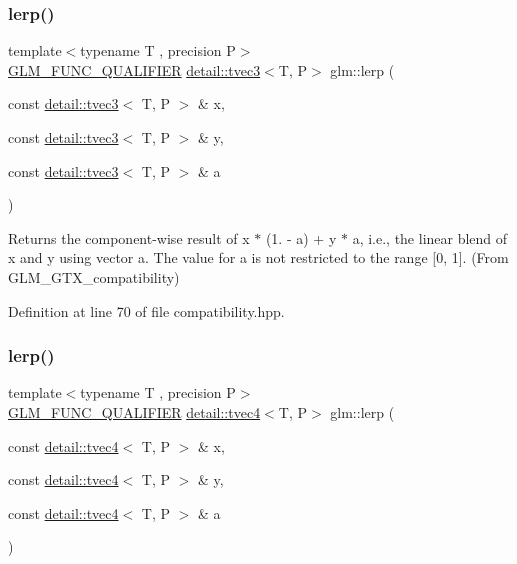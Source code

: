 \subsubsection{\texorpdfstring{lerp()}{lerp()}\hspace{0.1cm}{\footnotesize\ttfamily [6/7]}}
{\footnotesize\ttfamily template$<$typename T , precision P$>$ \\
\hyperlink{setup_8hpp_a33fdea6f91c5f834105f7415e2a64407}{G\+L\+M\+\_\+\+F\+U\+N\+C\+\_\+\+Q\+U\+A\+L\+I\+F\+I\+ER} \hyperlink{structglm_1_1detail_1_1tvec3}{detail\+::tvec3}$<$T, P$>$ glm\+::lerp (\begin{DoxyParamCaption}\item[{const \hyperlink{structglm_1_1detail_1_1tvec3}{detail\+::tvec3}$<$ T, P $>$ \&}]{x,  }\item[{const \hyperlink{structglm_1_1detail_1_1tvec3}{detail\+::tvec3}$<$ T, P $>$ \&}]{y,  }\item[{const \hyperlink{structglm_1_1detail_1_1tvec3}{detail\+::tvec3}$<$ T, P $>$ \&}]{a }\end{DoxyParamCaption})}



Returns the component-\/wise result of x $\ast$ (1. -\/ a) + y $\ast$ a, i.\+e., the linear blend of x and y using vector a. The value for a is not restricted to the range \mbox{[}0, 1\mbox{]}. (From G\+L\+M\+\_\+\+G\+T\+X\+\_\+compatibility) 



Definition at line 70 of file compatibility.\+hpp.

\mbox{\label{group__gtx__compatibility_ga48f60aeee275f1848cfc60a85fde96f2}} 
\subsubsection{\texorpdfstring{lerp()}{lerp()}\hspace{0.1cm}{\footnotesize\ttfamily [7/7]}}
{\footnotesize\ttfamily template$<$typename T , precision P$>$ \\
\hyperlink{setup_8hpp_a33fdea6f91c5f834105f7415e2a64407}{G\+L\+M\+\_\+\+F\+U\+N\+C\+\_\+\+Q\+U\+A\+L\+I\+F\+I\+ER} \hyperlink{structglm_1_1detail_1_1tvec4}{detail\+::tvec4}$<$T, P$>$ glm\+::lerp (\begin{DoxyParamCaption}\item[{const \hyperlink{structglm_1_1detail_1_1tvec4}{detail\+::tvec4}$<$ T, P $>$ \&}]{x,  }\item[{const \hyperlink{structglm_1_1detail_1_1tvec4}{detail\+::tvec4}$<$ T, P $>$ \&}]{y,  }\item[{const \hyperlink{structglm_1_1detail_1_1tvec4}{detail\+::tvec4}$<$ T, P $>$ \&}]{a }\end{DoxyParamCaption})}



